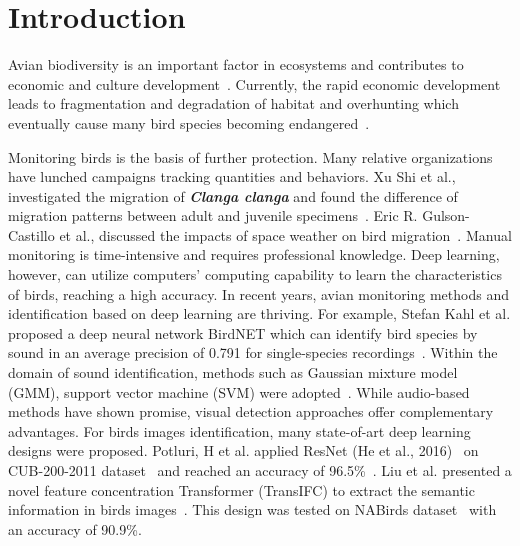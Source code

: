 \section{Introduction}
\newcommand{\textbi}[1]{\textit{\textbf{#1}}}
Avian biodiversity is an important factor 
in ecosystems and contributes to 
economic and culture development~\cite{bc1}. 
Currently, the rapid economic development leads to fragmentation and degradation of habitat and overhunting 
which eventually cause many bird species becoming endangered~\cite{bc1,bc2}. 

Monitoring birds is the basis of further protection.
Many relative organizations have lunched campaigns 
tracking quantities and behaviors. 
Xu Shi et al., investigated the migration of
\textbi{Clanga clanga} and found the difference of 
migration patterns between adult and juvenile specimens~\cite{bc3}.
Eric R. Gulson-Castillo et al., discussed the impacts 
of space weather on bird migration~\cite{bc4}.
Manual monitoring is time-intensive and requires professional knowledge.
Deep learning, however, can utilize computers' computing capability to learn the characteristics of birds, 
reaching a high accuracy.
In recent years, avian monitoring methods and identification based on deep learning are 
thriving. For example, Stefan Kahl et al.  
proposed a deep neural network BirdNET which can 
identify bird species by sound in an average precision of 
0.791 for single-species recordings~\cite{sa1}.
Within the domain of sound identification, methods
such as Gaussian mixture model (GMM),  support vector machine (SVM)
were adopted~\cite{sa2,sa3}. While audio-based methods have shown promise, visual detection approaches offer complementary advantages.
For birds images identification, many state-of-art deep learning designs
were proposed. Potluri, H et al. applied ResNet (He et al., 2016)~\cite{resnet} on 
CUB-200-2011 dataset~\cite{dataset1} and reached an accuracy of 96.5\%~\cite{sa4}.
Liu et al. presented a novel feature concentration Transformer 
(TransIFC) to extract the semantic information in birds images~\cite{sa5}. 
This design was tested on NABirds dataset~\cite{dataset2} with an accuracy of 90.9\%.


